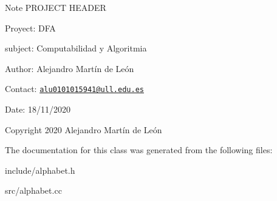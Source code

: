 \begin{DoxyNote}{Note}
P\+R\+O\+J\+E\+CT H\+E\+A\+D\+ER 

Proyect\+: D\+FA 

subject\+: Computabilidad y Algoritmia 

Author\+: Alejandro Martín de León 

Contact\+: \href{mailto:alu0101015941@ull.edu.es}{\tt alu0101015941@ull.\+edu.\+es} 

Date\+: 18/11/2020 

Copyright 2020 Alejandro Martín de León 
\end{DoxyNote}


The documentation for this class was generated from the following files\+:\begin{DoxyCompactItemize}
\item 
include/alphabet.\+h\item 
src/alphabet.\+cc\end{DoxyCompactItemize}
